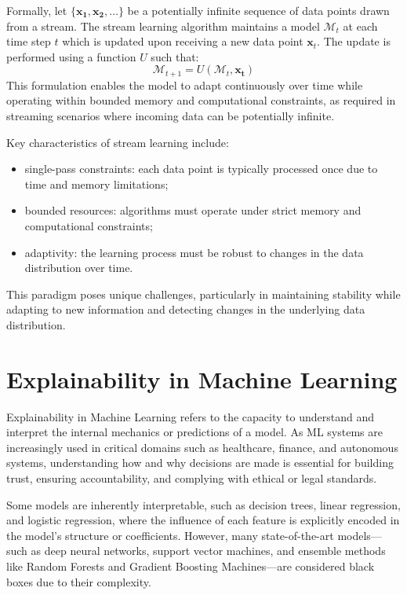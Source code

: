 Formally, let $\{\mathbf{x_1, x_2,\ldots} \} $ be a potentially infinite
sequence of data points drawn from a stream. The stream learning algorithm
maintains a model $\mathcal{M}_t$ at each time step $t$ which is updated upon
receiving a new data point $\mathbf{x}_t$. The update is performed using a
function $U$ such that:
\begin{equation}
    \mathcal{M}_{t+1} = U(\mathcal{M}_t, \mathbf{x_t})
\end{equation}
This formulation enables the model to adapt continuously over time while
operating within bounded memory and computational constraints, as required
in streaming scenarios where incoming data can be potentially infinite.

Key characteristics of stream learning include:
\begin{itemize}
    \item single-pass constraints: each data point is typically processed once due to
          time and memory limitations;
    \item bounded resources: algorithms must operate under strict memory and
          computational constraints;
    \item adaptivity: the learning process must be robust to changes in the data
          distribution over time.
\end{itemize}

This paradigm poses unique challenges, particularly in maintaining stability
while adapting to new information and detecting changes in the underlying data
distribution.

\section{Explainability in Machine Learning}\label{sec:explainability}

Explainability in Machine Learning refers to the capacity to understand and
interpret the internal mechanics or predictions of a model. As ML systems are
increasingly used in critical domains such as healthcare, finance, and
autonomous systems, understanding how and why decisions are made is essential
for building trust, ensuring accountability, and complying with ethical or
legal standards.

Some models are inherently interpretable, such as decision trees, linear
regression, and logistic regression, where the influence of each feature is
explicitly encoded in the model's structure or coefficients. However, many
state-of-the-art models—such as deep neural networks, support vector machines,
and ensemble methods like Random Forests and Gradient Boosting Machines—are
considered black boxes due to their complexity.

